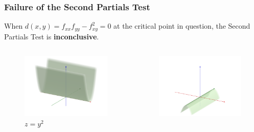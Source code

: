 \documentclass[10pt]{beamer}
\begin{document}
\begin{frame}
\frametitle{Failure of the Second Partials Test}
When $d(x,y) = f_{xx}f_{yy} - f_{xy}^2 = 0$ at the critical point in question, the Second Partials Test is {\bf inconclusive}.

\hspace{-1em}
\begin{minipage}{\textwidth}
\begin{columns}
\column{0.25\paperwidth}
\begin{figure}
\includegraphics[width = 0.25\paperwidth]{fail.png}
\caption{$z=y^2$}
\end{figure}
\column{0.25\paperwidth}
\begin{figure}
\includegraphics[width = 0.25\paperwidth]{fail2.png}

\end{figure}
\end{columns}
\end{minipage}
\end{frame}
\end{document}
